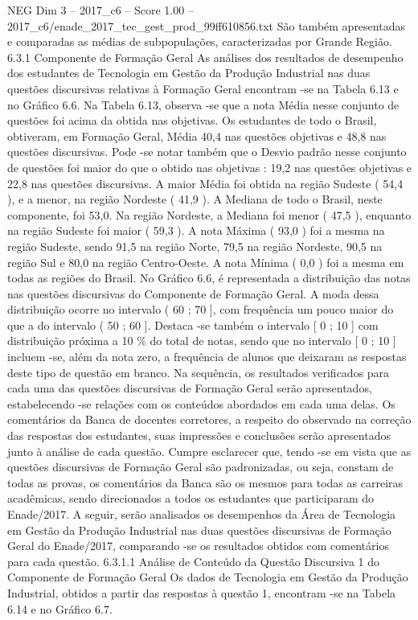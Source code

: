 \begin{textsample}{NEG Dim 3 – 2017\_c6 – Score 1.00 – 2017\_c6/enade\_2017\_tec\_gest\_prod\_99ff610856.txt}
São também apresentadas e comparadas as médias de subpopulações, caracterizadas por Grande Região. 6.3.1 Componente de Formação Geral As análises dos resultados de desempenho dos estudantes de Tecnologia em Gestão da Produção Industrial nas duas questões discursivas relativas à Formação Geral encontram -se na Tabela 6.13 e no Gráfico 6.6.
Na Tabela 6.13, observa -se que a nota Média nesse conjunto de questões foi acima da obtida nas objetivas.
Os estudantes de todo o Brasil, obtiveram, em Formação Geral, Média 40,4 nas questões objetivas e 48,8 nas questões discursivas.
Pode -se notar também que o Desvio padrão nesse conjunto de questões foi maior do que o obtido nas objetivas : 19,2 nas questões objetivas e 22,8 nas questões discursivas.
A maior Média foi obtida na região Sudeste ( 54,4 ), e a menor, na região Nordeste ( 41,9 ).
A Mediana de todo o Brasil, neste componente, foi 53,0.
Na região Nordeste, a Mediana foi menor ( 47,5 ), enquanto na região Sudeste foi maior ( 59,3 ).
A nota Máxima ( 93,0 ) foi a mesma na região Sudeste, sendo 91,5 na região Norte, 79,5 na região Nordeste, 90,5 na região Sul e 80,0 na região Centro-Oeste.
A nota Mínima ( 0,0 ) foi a mesma em todas as regiões do Brasil.
No Gráfico 6.6, é representada a distribuição das notas nas questões discursivas do Componente de Formação Geral.
A moda dessa distribuição ocorre no intervalo ( 60 ; 70 ], com frequência um pouco maior do que a do intervalo ( 50 ; 60 ].
Destaca -se também o intervalo [ 0 ; 10 ] com distribuição próxima a 10 \% do total de notas, sendo que no intervalo [ 0 ; 10 ] incluem -se, além da nota zero, a frequência de alunos que deixaram as respostas deste tipo de questão em branco.
Na sequência, os resultados verificados para cada uma das questões discursivas de Formação Geral serão apresentados, estabelecendo -se relações com os conteúdos abordados em cada uma delas.
Os comentários da Banca de docentes corretores, a respeito do observado na correção das respostas dos estudantes, suas impressões e conclusões serão apresentados junto à análise de cada questão.
Cumpre esclarecer que, tendo -se em vista que as questões discursivas de Formação Geral são padronizadas, ou seja, constam de todas as provas, os comentários da Banca são os mesmos para todas as carreiras acadêmicas, sendo direcionados a todos os estudantes que participaram do Enade/2017.
A seguir, serão analisados os desempenhos da Área de Tecnologia em Gestão da Produção Industrial nas duas questões discursivas de Formação Geral do Enade/2017, comparando -se os resultados obtidos com comentários para cada questão. 6.3.1.1 Análise de Conteúdo da Questão Discursiva 1 do Componente de Formação Geral Os dados de Tecnologia em Gestão da Produção Industrial, obtidos a partir das respostas à questão 1, encontram -se na Tabela 6.14 e no Gráfico 6.7.

\end{textsample}
